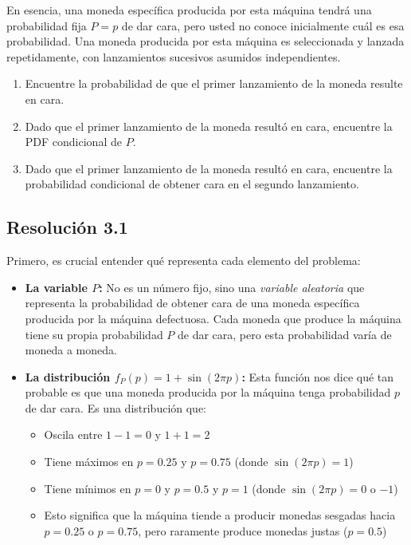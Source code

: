 \documentclass[
  11pt,
  letterpaper,
   addpoints,
  answers
  ]{exam}
\begin{document}
\begin{questions}
En esencia, una moneda específica producida por esta máquina tendrá una probabilidad fija $P = p$ de dar cara, pero usted no conoce inicialmente cuál es esa probabilidad. Una moneda producida por esta máquina es seleccionada y lanzada repetidamente, con lanzamientos sucesivos asumidos independientes.

\begin{enumerate}
    \item Encuentre la probabilidad de que el primer lanzamiento de la moneda resulte en cara.
    
    \item Dado que el primer lanzamiento de la moneda resultó en cara, encuentre la PDF condicional de $P$.
    
    \item Dado que el primer lanzamiento de la moneda resultó en cara, encuentre la probabilidad condicional de obtener cara en el segundo lanzamiento.
\end{enumerate}
\begin{solution}
  \subsection*{Resolución 3.1}

Primero, es crucial entender qué representa cada elemento del problema:

\begin{itemize}
\item \textbf{La variable $P$:} No es un número fijo, sino una \emph{variable aleatoria} que representa la probabilidad de obtener cara de una moneda específica producida por la máquina defectuosa. Cada moneda que produce la máquina tiene su propia probabilidad $P$ de dar cara, pero esta probabilidad varía de moneda a moneda.

\item \textbf{La distribución $f_P(p) = 1 + \sin(2\pi p)$:} Esta función nos dice qué tan probable es que una moneda producida por la máquina tenga probabilidad $p$ de dar cara. Es una distribución que:
\begin{itemize}
\item Oscila entre $1 - 1 = 0$ y $1 + 1 = 2$
\item Tiene máximos en $p = 0.25$ y $p = 0.75$ (donde $\sin(2\pi p) = 1$)
\item Tiene mínimos en $p = 0$ y $p = 0.5$ y $p = 1$ (donde $\sin(2\pi p) = 0$ o $-1$)
\item Esto significa que la máquina tiende a producir monedas sesgadas hacia $p = 0.25$ o $p = 0.75$, pero raramente produce monedas justas ($p = 0.5$)
\end{itemize}


\end{itemize}
\end{solution}
\end{questions}
\end{document}
